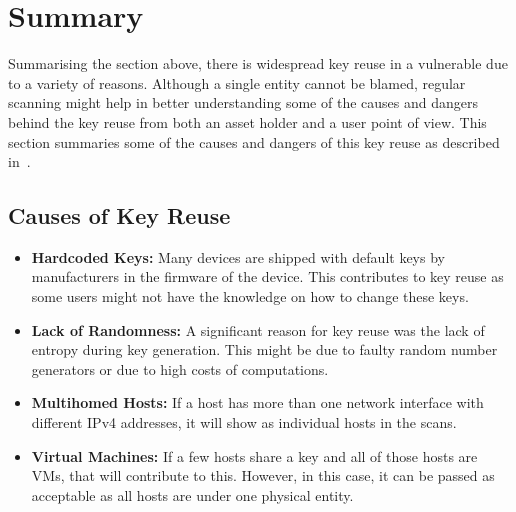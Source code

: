 \section{Summary}
Summarising the section above, there is widespread key reuse in a vulnerable due to a variety of reasons. 
Although a single entity cannot be blamed, regular scanning might help in better understanding some of the causes and dangers behind the 
key reuse from both an asset holder and a user point of view. 
\noindent This section summaries some of the causes and dangers of this key reuse as described in~\cite{180213,cryptoeprint:2018:299}.   
\subsection{Causes of Key Reuse}
\begin{itemize}
    \item \textbf{Hardcoded Keys:} Many devices are shipped with default keys by manufacturers in the firmware of the device. This contributes
    to key reuse as some users might not have the knowledge on how to change these keys.
    \item \textbf{Lack of Randomness:} A significant reason for key reuse was the lack of entropy during key generation. 
    This might be due to faulty random number generators or due to high costs of computations. 
    \item \textbf{Multihomed Hosts:} If a host has more than one network interface with different IPv4 addresses, it will show as individual 
    hosts in the scans. 
    \item \textbf{Virtual Machines:} If a few hosts share a key and all of those hosts are VMs, that will contribute to this. However, 
    in this case, it can be passed as acceptable as all hosts are under one physical entity.
\end{itemize}
